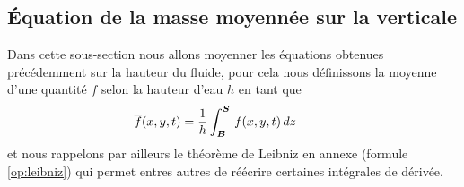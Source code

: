 \subsection{Équation de la masse moyennée sur la verticale}
%

\noindent Dans cette sous-section nous allons moyenner les équations obtenues précédemment sur la hauteur du fluide, pour cela nous définissons la moyenne d'une quantité $f$ selon la hauteur d'eau $h$ en tant que
\begin{equation*}
  	\overline{f}(x, y, t) = \frac{1}{h}\int_{\boldsymbol{B}}^{\boldsymbol{S}}\,f(x, y, t)\,dz\hspace{1cm}
\end{equation*}
et nous rappelons par ailleurs le théorème de Leibniz en annexe (formule \eqref{op:leibniz}) qui permet entres autres de réécrire certaines intégrales de dérivée.\\

